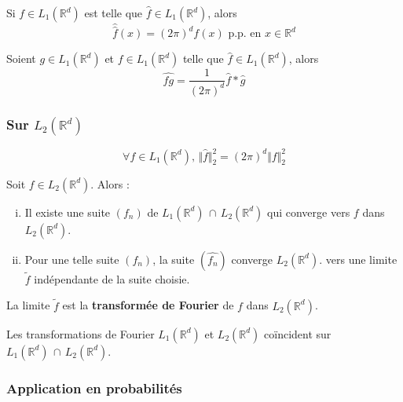 
	\begin{theorem}
		Si $f \in L_1(\mathbb{R}^d)$ est telle que $\widehat{f} \in L_1(\mathbb{R}^d)$, alors
		\[ \widehat{\widehat{f}}(x) = (2\pi)^d f(x) \text{ p.p. en } x \in \mathbb{R}^d \]
	\end{theorem}

	\begin{proposition}
		Soient $g \in L_1(\mathbb{R}^d)$ et $f \in L_1(\mathbb{R}^d)$ telle que $\widehat{f} \in L_1(\mathbb{R}^d)$, alors
		\[ \widehat{fg} = \frac{1}{(2\pi)^d} \widehat{f} * \widehat{g} \]
	\end{proposition}

	\subsubsection{Sur \texorpdfstring{$L_2(\mathbb{R}^d)$}{Rᵈ}}

	\begin{theorem}
		\[ \forall f \in L_1(\mathbb{R}^d), \, \Vert \widehat{f} \Vert^2_2 = (2 \pi)^d \Vert f \Vert^2_2 \]
	\end{theorem}

	\begin{theorem}
		Soit $f \in L_2(\mathbb{R}^d)$. Alors :
		\begin{enumerate}[(i)]
			\item Il existe une suite $(f_n)$ de $L_1(\mathbb{R}^d) \, \cap \, L_2(\mathbb{R}^d)$ qui converge vers $f$ dans $L_2(\mathbb{R}^d)$.
			\item Pour une telle suite $(f_n)$, la suite $(\widehat{f_n})$ converge $L_2(\mathbb{R}^d)$. vers une limite $\widetilde{f}$ indépendante de la suite choisie.
		\end{enumerate}
	\end{theorem}

	\begin{definition}
		La limite $\widetilde{f}$ est la \textbf{transformée de Fourier} de $f$ dans $L_2(\mathbb{R}^d)$.
	\end{definition}

	\begin{proposition}
		Les transformations de Fourier $L_1(\mathbb{R}^d)$ et $L_2(\mathbb{R}^d)$ coïncident sur $L_1(\mathbb{R}^d) \, \cap \, L_2(\mathbb{R}^d)$.
	\end{proposition}

	\subsubsection{Application en probabilités}

